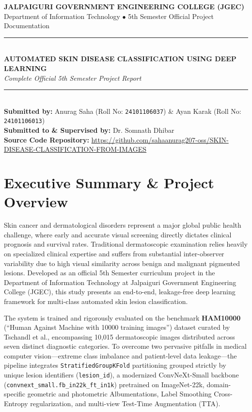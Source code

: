 \documentclass[12pt,a4paper]{article}
\begin{document}
\begin{center}
    {\Large \textbf{\color{primary} JALPAIGURI GOVERNMENT ENGINEERING COLLEGE (JGEC)}}\\[0.3em]
    {\normalsize Department of Information Technology $\bullet$ 5th Semester Official Project Documentation}\\[1.2em]
    \rule{\linewidth}{1.5pt}\\[0.6em]
    {\LARGE \textbf{AUTOMATED SKIN DISEASE CLASSIFICATION USING DEEP LEARNING}}\\[0.4em]
    {\large \textit{Complete Official 5th Semester Project Report}}\\[0.4em]
    \rule{\linewidth}{1.5pt}\\[1em]
    \textbf{Submitted by:} Anurag Saha (Roll No: \texttt{24101106037}) \& Ayan Karak (Roll No: \texttt{24101106013})\\[0.3em]
    \textbf{Submitted to \& Supervised by:} Dr. Somnath Dhibar\\[0.3em]
    \textbf{Source Code Repository:} \url{https://github.com/sahaanurag207-oss/SKIN-DISEASE-CLASSIFICATION-FROM-IMAGES}
\end{center}

\vspace{1em}

\section{Executive Summary \& Project Overview}
Skin cancer and dermatological disorders represent a major global public health challenge, where early and accurate visual screening directly dictates clinical prognosis and survival rates. Traditional dermatoscopic examination relies heavily on specialized clinical expertise and suffers from substantial inter-observer variability due to high visual similarity across benign and malignant pigmented lesions. Developed as an official 5th Semester curriculum project in the Department of Information Technology at Jalpaiguri Government Engineering College (JGEC), this study presents an end-to-end, leakage-free deep learning framework for multi-class automated skin lesion classification.

The system is trained and rigorously evaluated on the benchmark \textbf{HAM10000} (``Human Against Machine with 10000 training images'') dataset curated by Tschandl et al., encompassing 10,015 dermatoscopic images distributed across seven distinct diagnostic categories. To overcome two pervasive pitfalls in medical computer vision---extreme class imbalance and patient-level data leakage---the pipeline integrates \texttt{StratifiedGroupKFold} partitioning grouped strictly by unique lesion identifiers (\texttt{lesion\_id}), a modernized ConvNeXt-Small backbone (\texttt{convnext\_small.fb\_in22k\_ft\_in1k}) pretrained on ImageNet-22k, domain-specific geometric and photometric Albumentations, Label Smoothing Cross-Entropy regularization, and multi-view Test-Time Augmentation (TTA).
\end{document}
